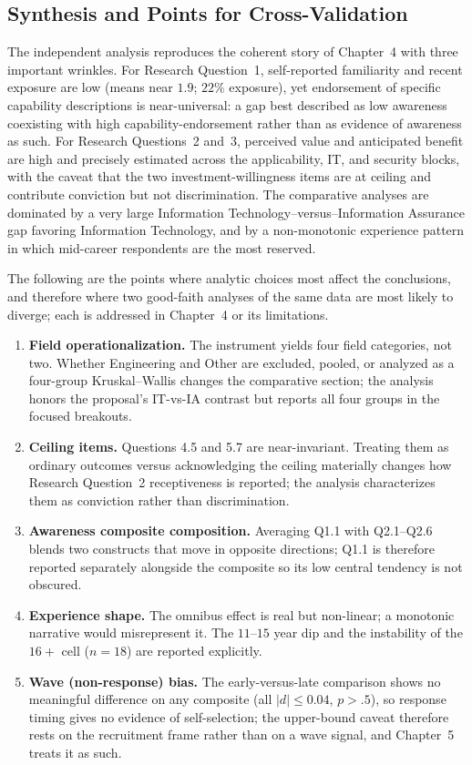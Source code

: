 \subsection{Synthesis and Points for Cross-Validation}

The independent analysis reproduces the coherent story of Chapter~4 with three important wrinkles. For Research Question~1, self-reported familiarity and recent exposure are low (means near $1.9$; $22\%$ exposure), yet endorsement of specific capability descriptions is near-universal: a gap best described as low awareness coexisting with high capability-endorsement rather than as evidence of awareness as such. For Research Questions~2 and~3, perceived value and anticipated benefit are high and precisely estimated across the applicability, IT, and security blocks, with the caveat that the two investment-willingness items are at ceiling and contribute conviction but not discrimination. The comparative analyses are dominated by a very large Information Technology--versus--Information Assurance gap favoring Information Technology, and by a non-monotonic experience pattern in which mid-career respondents are the most reserved.

The following are the points where analytic choices most affect the conclusions, and therefore where two good-faith analyses of the same data are most likely to diverge; each is addressed in Chapter~4 or its limitations.
\begin{enumerate}[leftmargin=1.4em,itemsep=2pt]
  \item \textbf{Field operationalization.} The instrument yields four field categories, not two. Whether Engineering and Other are excluded, pooled, or analyzed as a four-group Kruskal--Wallis changes the comparative section; the analysis honors the proposal's IT-vs-IA contrast but reports all four groups in the focused breakouts.
  \item \textbf{Ceiling items.} Questions 4.5 and 5.7 are near-invariant. Treating them as ordinary outcomes versus acknowledging the ceiling materially changes how Research Question~2 receptiveness is reported; the analysis characterizes them as conviction rather than discrimination.
  \item \textbf{Awareness composite composition.} Averaging Q1.1 with Q2.1--Q2.6 blends two constructs that move in opposite directions; Q1.1 is therefore reported separately alongside the composite so its low central tendency is not obscured.
  \item \textbf{Experience shape.} The omnibus effect is real but non-linear; a monotonic narrative would misrepresent it. The $11$--$15$ year dip and the instability of the $16+$ cell ($n=18$) are reported explicitly.
  \item \textbf{Wave (non-response) bias.} The early-versus-late comparison shows no meaningful difference on any composite (all $|d|\le0.04$, $p>.5$), so response timing gives no evidence of self-selection; the upper-bound caveat therefore rests on the recruitment frame rather than on a wave signal, and Chapter~5 treats it as such.
\end{enumerate}

